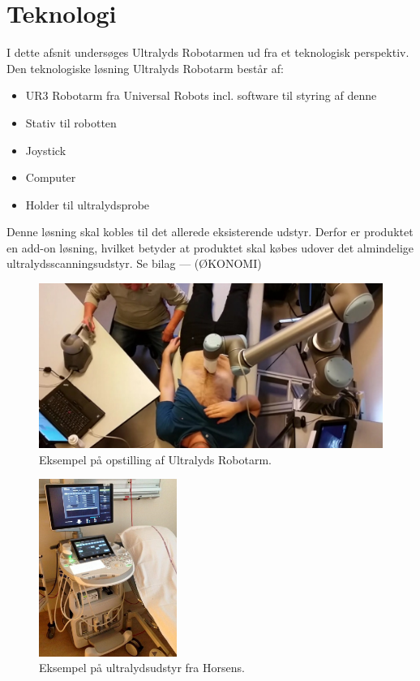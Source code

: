 \chapter{Teknologi}
I dette afsnit undersøges Ultralyds Robotarmen ud fra et teknologisk perspektiv. Den teknologiske løsning Ultralyds Robotarm består af:
\begin{itemize}
\item UR3 Robotarm fra Universal Robots incl. software til styring af denne
\item Stativ til robotten
\item Joystick
\item Computer
\item Holder til ultralydsprobe
\end{itemize}
Denne løsning skal kobles til det allerede eksisterende udstyr. Derfor er produktet en add-on løsning, hvilket betyder at produktet skal købes udover det almindelige ultralydsscanningsudstyr. Se bilag --- (ØKONOMI)
\begin{figure}[H]\centering
	\includegraphics[width = 1.0\textwidth]{Figurer/ergonomiskLosning.jpg}
	\caption{Eksempel på opstilling af Ultralyds Robotarm.}
	\label{ergonomiskLosning}
\end{figure}

\begin{figure}[H]\centering
	\includegraphics[width = 0.4\textwidth]{Figurer/udstyrHorsens.jpg}
	\caption{Eksempel på ultralydsudstyr fra Horsens.}
	\label{udstyrHorsens}
\end{figure}

